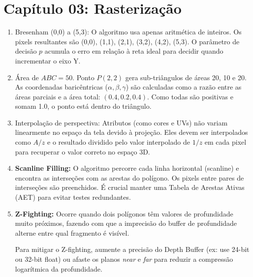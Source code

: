 \section*{Capítulo 03: Rasterização}
\begin{enumerate}
    \item Bresenham (0,0) a (5,3): O algoritmo usa apenas aritmética de inteiros. Os pixels resultantes são (0,0), (1,1), (2,1), (3,2), (4,2), (5,3). O parâmetro de decisão $p$ acumula o erro em relação à reta ideal para decidir quando incrementar o eixo Y.
    \item Área de $ABC = 50$. Ponto $P(2,2)$ gera sub-triângulos de áreas 20, 10 e 20. As coordenadas baricêntricas ($\alpha, \beta, \gamma$) são calculadas como a razão entre as áreas parciais e a área total: $(0.4, 0.2, 0.4)$. Como todas são positivas e somam 1.0, o ponto está dentro do triângulo.
    \item Interpolação de perspectiva: Atributos (como cores e UVs) não variam linearmente no espaço da tela devido à projeção. Eles devem ser interpolados como $A/z$ e o resultado dividido pelo valor interpolado de $1/z$ em cada pixel para recuperar o valor correto no espaço 3D.
    \item \textbf{Scanline Filling:} O algoritmo percorre cada linha horizontal (scanline) e encontra as interseções com as arestas do polígono. Os pixels entre pares de interseções são preenchidos. É crucial manter uma Tabela de Arestas Ativas (AET) para evitar testes redundantes.
    \item \textbf{Z-Fighting:} Ocorre quando dois polígonos têm valores de profundidade muito próximos, fazendo com que a imprecisão do buffer de profundidade alterne entre qual fragmento é visível.
    \begin{aviso}
    Para mitigar o Z-fighting, aumente a precisão do Depth Buffer (ex: use 24-bit ou 32-bit float) ou afaste os planos \textit{near} e \textit{far} para reduzir a compressão logarítmica da profundidade.
    \end{aviso}
\end{enumerate}


